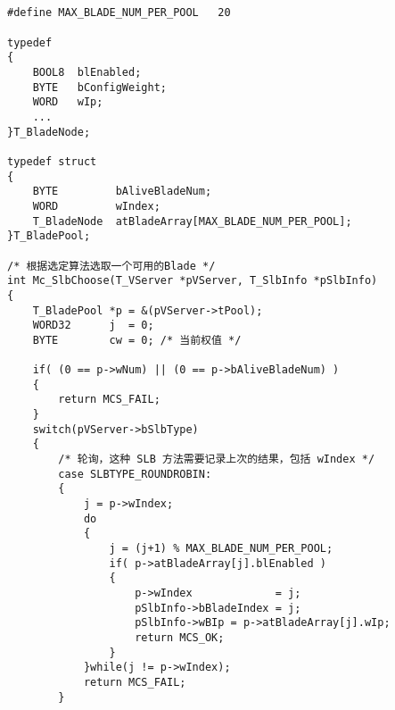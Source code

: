 ﻿\documentclass  [11pt,onecolumn]{article}
\begin{document}
\subsection{}
\begin{lstlisting}
#define MAX_BLADE_NUM_PER_POOL   20

typedef 
{
    BOOL8  blEnabled;
    BYTE   bConfigWeight;
    WORD   wIp;
    ...    
}T_BladeNode;

typedef struct
{
    BYTE         bAliveBladeNum;
    WORD         wIndex;
    T_BladeNode  atBladeArray[MAX_BLADE_NUM_PER_POOL];    
}T_BladePool;

/* 根据选定算法选取一个可用的Blade */
int Mc_SlbChoose(T_VServer *pVServer, T_SlbInfo *pSlbInfo)
{
    T_BladePool *p = &(pVServer->tPool);  
    WORD32      j  = 0;
    BYTE        cw = 0; /* 当前权值 */

    if( (0 == p->wNum) || (0 == p->bAliveBladeNum) )
    {
        return MCS_FAIL;
    }
    switch(pVServer->bSlbType)
    {
        /* 轮询，这种 SLB 方法需要记录上次的结果，包括 wIndex */
        case SLBTYPE_ROUNDROBIN: 
        {
            j = p->wIndex;
            do
            {
                j = (j+1) % MAX_BLADE_NUM_PER_POOL;
                if( p->atBladeArray[j].blEnabled )
                {
                    p->wIndex             = j;
                    pSlbInfo->bBladeIndex = j;
                    pSlbInfo->wBIp = p->atBladeArray[j].wIp;
                    return MCS_OK;
                }
            }while(j != p->wIndex);
            return MCS_FAIL;
        }


\end{lstlisting}
\end{document}
